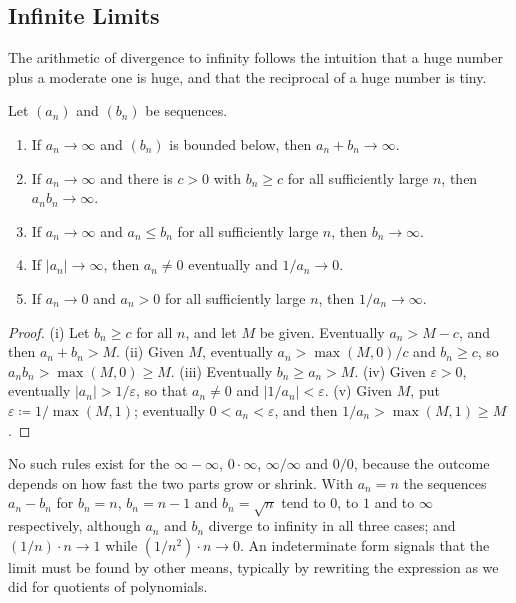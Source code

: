 \subsection{Infinite Limits}

The arithmetic of divergence to infinity follows the intuition that a huge number plus a moderate one is huge, and that the reciprocal of a huge number is tiny.

\begin{proposition}
\label{prop:infinite-laws}
Let $(a_n)$ and $(b_n)$ be sequences.
\begin{enumerate}
\item If $a_n\to\infty$ and $(b_n)$ is bounded below, then $a_n+b_n\to\infty$.
\item If $a_n\to\infty$ and there is $c>0$ with $b_n\ge c$ for all sufficiently large $n$, then $a_nb_n\to\infty$.
\item If $a_n\to\infty$ and $a_n\le b_n$ for all sufficiently large $n$, then $b_n\to\infty$.
\item If $|a_n|\to\infty$, then $a_n\ne0$ eventually and $1/a_n\to0$.
\item If $a_n\to0$ and $a_n>0$ for all sufficiently large $n$, then $1/a_n\to\infty$.
\end{enumerate}
\end{proposition}

\begin{proof}
(i) Let $b_n\ge c$ for all $n$, and let $M$ be given. Eventually $a_n>M-c$, and then $a_n+b_n>M$. (ii) Given $M$, eventually $a_n>\max(M,0)/c$ and $b_n\ge c$, so $a_nb_n>\max(M,0)\ge M$. (iii) Eventually $b_n\ge a_n>M$. (iv) Given $\varepsilon>0$, eventually $|a_n|>1/\varepsilon$, so that $a_n\ne0$ and $|1/a_n|<\varepsilon$. (v) Given $M$, put $\varepsilon\coloneqq1/\max(M,1)$; eventually $0<a_n<\varepsilon$, and then $1/a_n>\max(M,1)\ge M$.
\end{proof}

No such rules exist for the  $\infty-\infty$, $0\cdot\infty$, $\infty/\infty$ and $0/0$, because the outcome depends on how fast the two parts grow or shrink. With $a_n=n$ the sequences $a_n-b_n$ for $b_n=n$, $b_n=n-1$ and $b_n=\sqrt n$ tend to $0$, to $1$ and to $\infty$ respectively, although $a_n$ and $b_n$ diverge to infinity in all three cases; and $(1/n)\cdot n\to1$ while $(1/n^2)\cdot n\to0$. An indeterminate form signals that the limit must be found by other means, typically by rewriting the expression as we did for quotients of polynomials.

